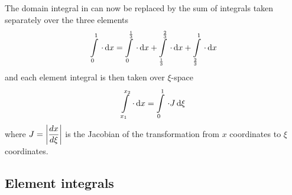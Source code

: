 The domain integral in  can now be 
replaced by the sum of integrals taken separately over the three elements
\begin{equation*}
  \gint{0}{1}{\cdot}{x}=\gint{0}{\frac13}{\cdot}{x} + \gint{\frac13}{\frac23}{\cdot}{x} +
  \gint{\frac23}{1}{\cdot}{x}
\end{equation*}
and each element integral is then taken over $\xi$-space
\begin{equation*}
  \gint{x_{1}}{x_{2}}{\cdot}{x} = \gint{0}{1}{\cdot J}{\xi}
\end{equation*}
where $J =\left|  \dfrac{ d x}{d \xi}  \right|$ is the Jacobian of the transformation 
from $x$ coordinates to $\xi$ coordinates.

\subsection{Element integrals}


